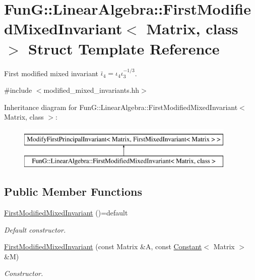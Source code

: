 \hypertarget{structFunG_1_1LinearAlgebra_1_1FirstModifiedMixedInvariant}{\section{Fun\-G\-:\-:Linear\-Algebra\-:\-:First\-Modified\-Mixed\-Invariant$<$ Matrix, class $>$ Struct Template Reference}
\label{structFunG_1_1LinearAlgebra_1_1FirstModifiedMixedInvariant}
}


First modified mixed invariant $\bar\iota_4=\iota_4\iota_3^{-1/3}$.  




{\ttfamily \#include $<$modified\-\_\-mixed\-\_\-invariants.\-hh$>$}

Inheritance diagram for Fun\-G\-:\-:Linear\-Algebra\-:\-:First\-Modified\-Mixed\-Invariant$<$ Matrix, class $>$\-:\begin{figure}[H]
\begin{center}
\leavevmode
\includegraphics[height=2.000000cm]{structFunG_1_1LinearAlgebra_1_1FirstModifiedMixedInvariant}
\end{center}
\end{figure}
\subsection*{Public Member Functions}
\begin{DoxyCompactItemize}
\item 
\hypertarget{structFunG_1_1LinearAlgebra_1_1FirstModifiedMixedInvariant_a8ca742718588da8bf869fe3aa18aaa7d}{\hyperlink{structFunG_1_1LinearAlgebra_1_1FirstModifiedMixedInvariant_a8ca742718588da8bf869fe3aa18aaa7d}{First\-Modified\-Mixed\-Invariant} ()=default}\label{structFunG_1_1LinearAlgebra_1_1FirstModifiedMixedInvariant_a8ca742718588da8bf869fe3aa18aaa7d}

\begin{DoxyCompactList}\small\item\em Default constructor. \end{DoxyCompactList}\item 
\hyperlink{structFunG_1_1LinearAlgebra_1_1FirstModifiedMixedInvariant_a2061f3b57b0576e38d1f9dd19bff798a}{First\-Modified\-Mixed\-Invariant} (const Matrix \&A, const \hyperlink{structFunG_1_1Constant}{Constant}$<$ Matrix $>$ \&M)
\begin{DoxyCompactList}\small\item\em Constructor. \end{DoxyCompactList}\end{DoxyCompactItemize}



